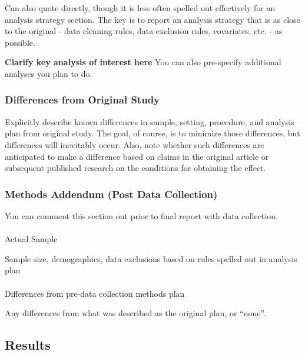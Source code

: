 \documentclass[
  letterpaper,
  DIV=11,
  numbers=noendperiod]{scrartcl}
\makeatletter
\let\oldparagraph\paragraph
\renewcommand{\paragraph}{
    \@ifstar
      \xxxParagraphStar
      \xxxParagraphNoStar
  }
\newcommand{\xxxParagraphStar}[1]{\oldparagraph*{#1}\mbox{}}
\newcommand{\xxxParagraphNoStar}[1]{\oldparagraph{#1}\mbox{}}
\makeatother
\begin{document}
Can also quote directly, though it is less often spelled out effectively
for an analysis strategy section. The key is to report an analysis
strategy that is as close to the original - data cleaning rules, data
exclusion rules, covariates, etc. - as possible.

\textbf{Clarify key analysis of interest here} You can also pre-specify
additional analyses you plan to do.

\subsubsection{Differences from Original
Study}\label{differences-from-original-study}

Explicitly describe known differences in sample, setting, procedure, and
analysis plan from original study. The goal, of course, is to minimize
those differences, but differences will inevitably occur. Also, note
whether such differences are anticipated to make a difference based on
claims in the original article or subsequent published research on the
conditions for obtaining the effect.

\subsubsection{Methods Addendum (Post Data
Collection)}\label{methods-addendum-post-data-collection}

You can comment this section out prior to final report with data
collection.

\paragraph{Actual Sample}\label{actual-sample}

Sample size, demographics, data exclusions based on rules spelled out in
analysis plan

\paragraph{Differences from pre-data collection methods
plan}\label{differences-from-pre-data-collection-methods-plan}

Any differences from what was described as the original plan, or
``none''.

\subsection{Results}\label{results}
\end{document}
